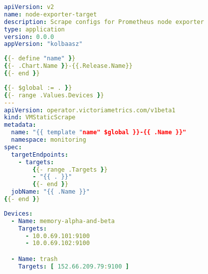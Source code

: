 \begin{lstlisting}[language=yaml,caption=./Chart.yaml]
apiVersion: v2
name: node-exporter-target
description: Scrape configs for Prometheus node exporter
type: application
version: 0.0.0
appVersion: "kolbaasz"
\end{lstlisting}

\begin{lstlisting}[language=yaml,caption=./templates/\_helpers.tmpl]
{{- define "name" }}
{{- .Chart.Name }}-{{.Release.Name}}
{{- end }}
\end{lstlisting}

\begin{lstlisting}[language=yaml,caption=./templates/node-exporter.yaml]
{{- $global := . }}
{{- range .Values.Devices }}
---
apiVersion: operator.victoriametrics.com/v1beta1
kind: VMStaticScrape
metadata:
  name: "{{ template "name" $global }}-{{ .Name }}"
  namespace: monitoring
spec:
  targetEndpoints:
    - targets:
        {{- range .Targets }}
        - "{{ . }}"
        {{- end }}
  jobName: "{{ .Name }}"
{{- end }}
\end{lstlisting}

\begin{lstlisting}[language=yaml,caption=./values.yaml]
Devices:
  - Name: memory-alpha-and-beta
    Targets:
      - 10.0.69.101:9100
      - 10.0.69.102:9100

  - Name: trash
    Targets: [ 152.66.209.79:9100 ]
\end{lstlisting}
